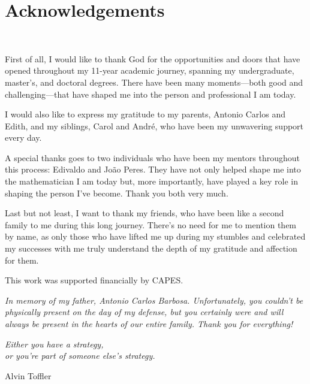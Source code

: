\documentclass[12pt,oneside]{book}
\begin{document}
    \newpage
    \chapter*{Acknowledgements}
    \thispagestyle{empty}
    \

    First of all, I would like to thank God for the opportunities and doors that have opened throughout 
    my 11-year academic journey, spanning my undergraduate, master’s, and doctoral degrees. There have 
    been many moments—both good and challenging—that have shaped me into the person and professional I 
    am today.

    I would also like to express my gratitude to my parents, Antonio Carlos and Edith, and my siblings, 
    Carol and André, who have been my unwavering support every day.

    A special thanks goes to two individuals who have been my mentors throughout this process: Edivaldo 
    and João Peres. They have not only helped shape me into the mathematician I am today but, more 
    importantly, have played a key role in shaping the person I’ve become. Thank you both very much.

    Last but not least, I want to thank my friends, who have been like a second family to me during this 
    long journey. There’s no need for me to mention them by name, as only those who have lifted me up 
    during my stumbles and celebrated my successes with me truly understand the depth of my gratitude 
    and affection for them.

    This work was supported financially by CAPES.



    \vspace{2cm}

    \begin{center}
        \begin{minipage}{10cm}
            \textit{In memory of my father, Antonio Carlos Barbosa. Unfortunately, you couldn't be 
            physically present on the day of my defense, but you certainly were and will always be 
            present in the hearts of our entire family. Thank you for everything!}
        \end{minipage}
    \end{center}



    \newpage
    \thispagestyle{empty}

    \begin{flushright}
        \begin{minipage}{8cm}
            \begin{flushright}
                \vspace{22cm}\textit{Either you have a strategy,\\
                or you're part of someone else's strategy.}

                \vspace{0.2cm} Alvin Toffler
            \end{flushright}
        \end{minipage}
    \end{flushright}
\end{document}
